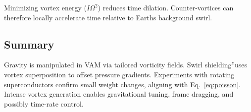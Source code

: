 Minimizing vortex energy ($I\Omega^2$) reduces time dilation. Counter-vortices can therefore locally accelerate time relative to Earth\rqs s background swirl.

\subsection{Summary}
Gravity is manipulated in VAM via tailored vorticity fields. \grqq Swirl shielding\textquotedblright uses vortex superposition to offset pressure gradients. Experiments with rotating superconductors confirm small weight changes, aligning with Eq.~\eqref{eq:poisson}. Intense vortex generation enables gravitational tuning, frame dragging, and possibly time-rate control.
